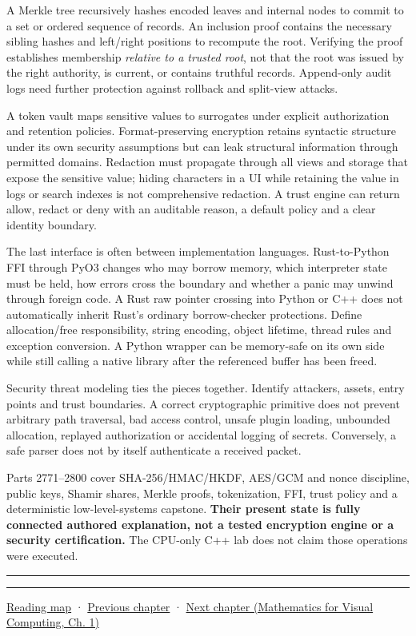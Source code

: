 A Merkle tree recursively hashes encoded leaves and internal nodes to commit to a set or ordered sequence of records. An inclusion proof contains the necessary sibling hashes and left/right positions to recompute the root. Verifying the proof establishes membership \emph{relative to a trusted root}, not that the root was issued by the right authority, is current, or contains truthful records. Append-only audit logs need further protection against rollback and split-view attacks.

A token vault maps sensitive values to surrogates under explicit authorization and retention policies. Format-preserving encryption retains syntactic structure under its own security assumptions but can leak structural information through permitted domains. Redaction must propagate through all views and storage that expose the sensitive value; hiding characters in a UI while retaining the value in logs or search indexes is not comprehensive redaction. A trust engine can return allow, redact or deny with an auditable reason, a default policy and a clear identity boundary.

The last interface is often between implementation languages. Rust-to-Python FFI through PyO3 changes who may borrow memory, which interpreter state must be held, how errors cross the boundary and whether a panic may unwind through foreign code. A Rust raw pointer crossing into Python or C++ does not automatically inherit Rust's ordinary borrow-checker protections. Define allocation/free responsibility, string encoding, object lifetime, thread rules and exception conversion. A Python wrapper can be memory-safe on its own side while still calling a native library after the referenced buffer has been freed.

Security threat modeling ties the pieces together. Identify attackers, assets, entry points and trust boundaries. A correct cryptographic primitive does not prevent arbitrary path traversal, bad access control, unsafe plugin loading, unbounded allocation, replayed authorization or accidental logging of secrets. Conversely, a safe parser does not by itself authenticate a received packet.

Parts 2771--2800 cover SHA-256/HMAC/HKDF, AES/GCM and nonce discipline, public keys, Shamir shares, Merkle proofs, tokenization, FFI, trust policy and a deterministic low-level-systems capstone. \textbf{Their present state is fully connected authored explanation, not a tested encryption engine or a security certification.} The CPU-only C++ lab does not claim those operations were executed.

\begin{center}\rule{0.5\linewidth}{0.5pt}\end{center}

\begin{center}\rule{0.5\linewidth}{0.5pt}\end{center}

\hyperref[volume-reading-map]{Reading map} · \hyperref[01-foundations-i-ch015-execute-and-measure-a-metal-frame]{Previous chapter} · \href{../02-Mathematics-for-Visual-Computing/main.pdf\#nameddest=01-foundations-i-ch017-python-and-numerical-tools-for-graphics-systems}{Next chapter (Mathematics for Visual Computing, Ch. 1)}
